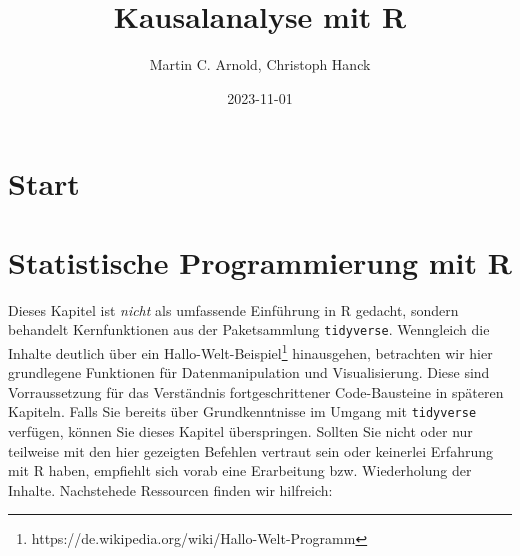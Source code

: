 \documentclass[
  a4paper,
  DIV=11,
  oneside]{scrreprt}
\title{Kausalanalyse mit R}
\author{Martin C. Arnold, Christoph Hanck}
\date{2023-11-01}
\renewcommand*\contentsname{Inhaltsverzeichnis}
\newcommand\contentsname{Inhaltsverzeichnis}
\begin{document}
\maketitle


\renewcommand*\contentsname{Inhaltsverzeichnis}
{
\hypersetup{linkcolor=}
\setcounter{tocdepth}{2}
\tableofcontents
}

\chapter{Start}\label{start}


\chapter{Statistische Programmierung mit
R}\label{statistische-programmierung-mit-r}

Dieses Kapitel ist \emph{nicht} als umfassende Einführung in R gedacht,
sondern behandelt Kernfunktionen aus der Paketsammlung
\texttt{tidyverse}. Wenngleich die Inhalte deutlich über ein
Hallo-Welt-Beispiel\footnote{https://de.wikipedia.org/wiki/Hallo-Welt-Programm}
hinausgehen, betrachten wir hier grundlegene Funktionen für
Datenmanipulation und Visualisierung. Diese sind Vorraussetzung für das
Verständnis fortgeschrittener Code-Bausteine in späteren Kapiteln. Falls
Sie bereits über Grundkenntnisse im Umgang mit \texttt{tidyverse}
verfügen, können Sie dieses Kapitel überspringen. Sollten Sie nicht oder
nur teilweise mit den hier gezeigten Befehlen vertraut sein oder
keinerlei Erfahrung mit R haben, empfiehlt sich vorab eine Erarbeitung
bzw. Wiederholung der Inhalte. Nachstehede Ressourcen finden wir
hilfreich:
\end{document}
